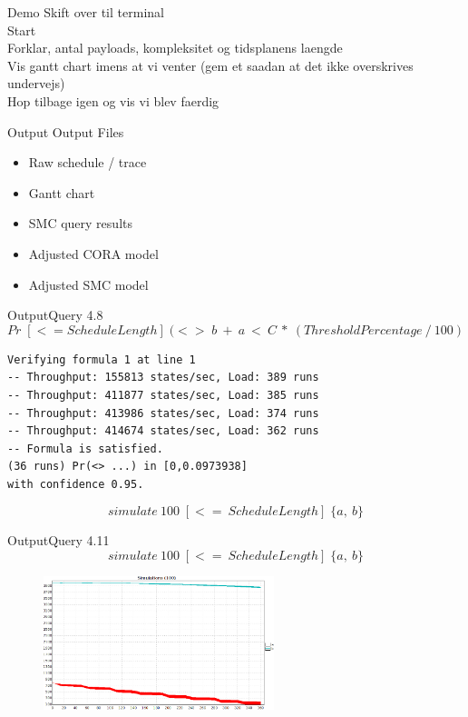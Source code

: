 \begin{frame}{Demo}{}
	Skift over til terminal\\
	Start\\
	Forklar, antal payloads, kompleksitet og tidsplanens laengde\\
	Vis gantt chart imens at vi venter (gem et saadan at det ikke overskrives undervejs)\\
	Hop tilbage igen og vis vi blev faerdig
\end{frame}

\begin{frame}{Output}{}
	Output Files
	\begin{itemize}
		\item Raw schedule / trace
		\item Gantt chart
		\item SMC query results
		\item Adjusted CORA model
		\item Adjusted SMC model
	\end{itemize}
\end{frame}

\begin{frame}[fragile]{Output}{Query 4.8}
	\begin{equation*}
		Pr\; [<=ScheduleLength] \; (<>\; b\ +\ a\ <\ C\ *\ (ThresholdPercentage\ /\ 100)
	\end{equation*}
	\begin{lstlisting}
Verifying formula 1 at line 1
-- Throughput: 155813 states/sec, Load: 389 runs
-- Throughput: 411877 states/sec, Load: 385 runs
-- Throughput: 413986 states/sec, Load: 374 runs
-- Throughput: 414674 states/sec, Load: 362 runs
-- Formula is satisfied.
(36 runs) Pr(<> ...) in [0,0.0973938]
with confidence 0.95.
	\end{lstlisting}
	\pause
	\begin{equation*}
		simulate\ 100 \; [<=\ ScheduleLength]\; \{ a,\ b\}
	\end{equation*}
\end{frame}

\begin{frame}{Output}{Query 4.11}
	\begin{equation*}
		simulate\ 100 \; [<=\ ScheduleLength]\; \{ a,\ b\}
	\end{equation*}
	\begin{figure}
		\includegraphics[width=0.60\textwidth]{graphics/ab.png}
		\end{figure}
\end{frame}

